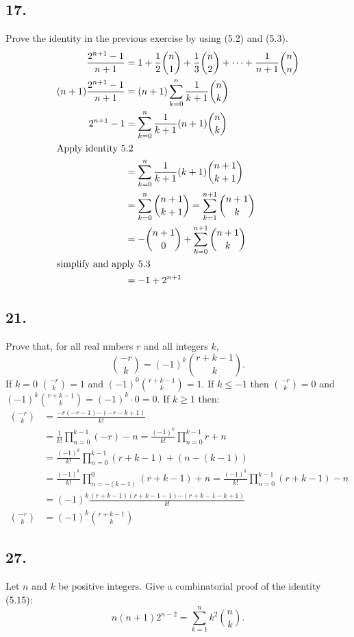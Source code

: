 \documentclass{article}
\begin{document}
\subsection*{17.}
Prove the identity in the previous exercise by  using (5.2) and (5.3).
\begin{align*}
  \frac{2^{n+1}-1}{n+1}&=1+\frac{1}{2}\binom{n}{1}+\frac{1}{3}\binom{n}{2}+\dots+\frac{1}{n+1}\binom{n}{n}\\
  (n+1)\frac{2^{n+1}-1}{n+1}&=(n+1)\sum\limits_{k=0}^n{\frac{1}{k+1}\binom{n}{k}}\\
  2^{n+1}-1&=\sum\limits_{k=0}^n{\frac{1}{k+1}(n+1)\binom{n}{k}}\\
  \intertext{Apply identity 5.2}
  &=\sum\limits_{k=0}^n{\frac{1}{k+1}(k+1)\binom{n+1}{k+1}}\\
  &=\sum\limits_{k=0}^n{\binom{n+1}{k+1}}=\sum\limits_{k=1}^{n+1}{\binom{n+1}{k}}\\
  &=-\binom{n+1}{0}+\sum\limits_{k=0}^{n+1}{\binom{n+1}{k}}\\
  \intertext{simplify and apply 5.3}
  &=-1+2^{n+1}
\end{align*}
\subsection*{21.}
Prove that, for all real nmbers $r$ and all integers $k$,
\[\binom{-r}{k}=(-1)^k\binom{r+k-1}{k}.\]
If $k=0$ $\binom{-r}{k}=1$ and $(-1)^0\binom{r+k-1}{k}=1$. If $k\le-1$ then $\binom{-r}{k}=0$ and $(-1)^k\binom{r+k-1}{k}=(-1)^k\cdot0=0$. If $k\ge1$ then:
\begin{align*}
  \binom{-r}{k}&=\frac{-r(-r-1)\cdots(-r-k+1)}{k!}\\
  &=\frac{1}{k!}\prod_{n=0}^{k-1}{(-r)-n}=\frac{(-1)^k}{k!}\prod_{n=0}^{k-1}{r+n}\\
  &=\frac{(-1)^k}{k!}\prod_{n=0}^{k-1}{(r+k-1)+(n-(k-1))}\\
  &=\frac{(-1)^k}{k!}\prod_{n=-(k-1)}^{0}{(r+k-1)+n}=\frac{(-1)^k}{k!}\prod_{n=0}^{k-1}{(r+k-1)-n}\\
  &=(-1)^k\frac{(r+k-1)(r+k-1-1)\cdots(r+k-1-k+1)}{k!}\\
  \binom{-r}{k}&=(-1)^k\binom{r+k-1}{k}
\end{align*}
\subsection*{27.}
Let $n$ and $k$ be positive integers. Give a combinatorial proof of the identity (5.15):
\[n(n+1)2^{n-2}=\sum\limits_{k=1}^n{k^2\binom{n}{k}}.\]
\end{document}
